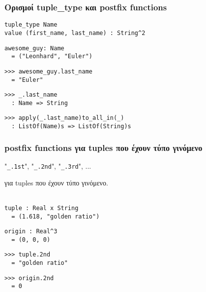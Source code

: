 \documentclass{beamer}
\def\e{\foreignlanguage{english}}
\begin{document}
\begin{frame}[fragile]

\frametitle{Ορισμοί \e{tuple\_type} και \e{postfix functions}}

\begin{otherlanguage}{english}
\begin{verbatim}
tuple_type Name
value (first_name, last_name) : String^2
\end{verbatim}
\begin{verbatim}
awesome_guy: Name
  = ("Leonhard", "Euler")
\end{verbatim}
\begin{verbatim}
>>> awesome_guy.last_name
  = "Euler"
\end{verbatim}
\begin{verbatim}
>>> _.last_name
  : Name => String
\end{verbatim}
\begin{verbatim}
>>> apply(_.last_name)to_all_in(_)
  : ListOf(Name)s => ListOf(String)s
\end{verbatim}
\end{otherlanguage}

\end{frame}

\begin{frame}[fragile]

\frametitle{\e{postfix functions} για \e{tuples} που έχουν τύπο γινόμενο}

\begin{otherlanguage}{english}
"\verb|_.1st|", "\verb|_.2nd|", "\verb|_.3rd|", ...
\end{otherlanguage}
για \e{tuples} που έχουν τύπο γινόμενο.
\\~\

\begin{otherlanguage}{english}
\begin{verbatim}
tuple : Real x String
  = (1.618, "golden ratio")
\end{verbatim}

\begin{verbatim}
origin : Real^3
  = (0, 0, 0)
\end{verbatim}

\begin{verbatim}
>>> tuple.2nd
  = "golden ratio"
\end{verbatim}

\begin{verbatim}
>>> origin.2nd
  = 0

\end{verbatim}
\end{otherlanguage}

\end{frame}
\end{document}
